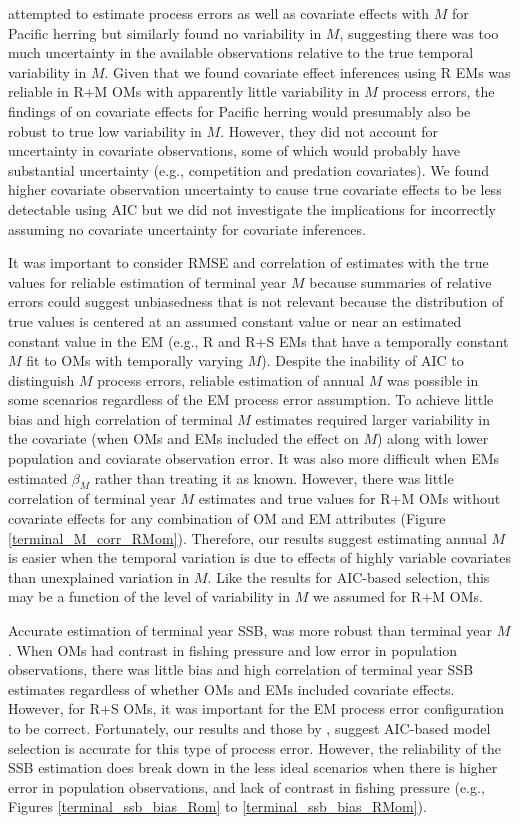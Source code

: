 \documentclass[
  12pt,
]{article}
\begin{document}
\citet{derisoetal08} attempted to estimate process errors as well as covariate effects with \(M\) for Pacific herring but similarly found no variability in \(M\), suggesting there was too much uncertainty in the available observations relative to the true temporal variability in \(M\). Given that we found covariate effect inferences using R EMs was reliable in R+M OMs with apparently little variability in \(M\) process errors, the findings of \citet{derisoetal08} on covariate effects for Pacific herring would presumably also be robust to true low variability in \(M\). However, they did not account for uncertainty in covariate observations, some of which would probably have substantial uncertainty (e.g., competition and predation covariates). We found higher covariate observation uncertainty to cause true covariate effects to be less detectable using AIC but we did not investigate the implications for incorrectly assuming no covariate uncertainty for covariate inferences.

It was important to consider RMSE and correlation of estimates with the true values for reliable estimation of terminal year \(M\) because summaries of relative errors could suggest unbiasedness that is not relevant because the distribution of true values is centered at an assumed constant value or near an estimated constant value in the EM (e.g., R and R+S EMs that have a temporally constant \(M\) fit to OMs with temporally varying \(M\)). Despite the inability of AIC to distinguish \(M\) process errors, reliable estimation of annual \(M\) was possible in some scenarios regardless of the EM process error assumption. To achieve little bias and high correlation of terminal \(M\) estimates required larger variability in the covariate (when OMs and EMs included the effect on \(M\)) along with lower population and coviarate observation error. It was also more difficult when EMs estimated \(\beta_M\) rather than treating it as known. However, there was little correlation of terminal year \(M\) estimates and true values for R+M OMs without covariate effects for any combination of OM and EM attributes (Figure \ref{terminal_M_corr_RMom}). Therefore, our results suggest estimating annual \(M\) is easier when the temporal variation is due to effects of highly variable covariates than unexplained variation in \(M\). Like the results for AIC-based selection, this may be a function of the level of variability in \(M\) we assumed for R+M OMs.

Accurate estimation of terminal year SSB, was more robust than terminal year \(M\). When OMs had contrast in fishing pressure and low error in population observations, there was little bias and high correlation of terminal year SSB estimates regardless of whether OMs and EMs included covariate effects. However, for R+S OMs, it was important for the EM process error configuration to be correct. Fortunately, our results and those by \citet{milleretal_inreview1}, suggest AIC-based model selection is accurate for this type of process error. However, the reliability of the SSB estimation does break down in the less ideal scenarios when there is higher error in population observations, and lack of contrast in fishing pressure (e.g., Figures \ref{terminal_ssb_bias_Rom} to \ref{terminal_ssb_bias_RMom}).
\end{document}
